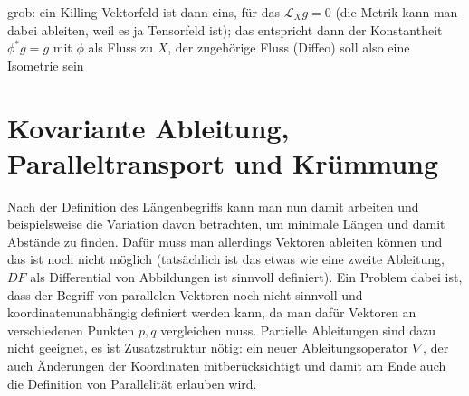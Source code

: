 \documentclass[../H_Analysis_main.tex]{subfiles}
\begin{document}
grob: ein Killing-Vektorfeld ist dann eins, für das $\mathcal{L}_X g = 0$ (die Metrik kann man dabei ableiten, weil es ja Tensorfeld ist); das entspricht dann der Konstantheit $\phi^* g = g$ mit $\phi$ als Fluss zu $X$, der zugehörige Fluss (Diffeo) soll also eine Isometrie sein


\newpage


	\section{Kovariante Ableitung, Paralleltransport und Krümmung}
Nach der Definition des Längenbegriffs kann man nun damit arbeiten und beispielsweise die Variation davon betrachten, um minimale Längen und damit Abstände zu finden. Dafür muss man allerdings Vektoren ableiten können und das ist noch nicht möglich (tatsächlich ist das etwas wie eine zweite Ableitung, $DF$ als Differential von Abbildungen ist sinnvoll definiert). Ein Problem dabei ist, dass der Begriff von parallelen Vektoren noch nicht sinnvoll und koordinatenunabhängig definiert werden kann, da man dafür Vektoren an verschiedenen Punkten $p, q$ vergleichen muss. %
Partielle Ableitungen sind dazu nicht geeignet, es ist Zusatzstruktur nötig: ein neuer Ableitungsoperator $\nabla$, der auch Änderungen der Koordinaten mitberücksichtigt und damit am Ende auch die Definition von Parallelität erlauben wird.



\end{document}
